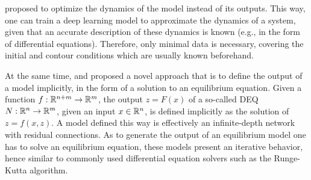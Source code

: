 \textcite{Raissi2019} proposed to optimize the dynamics of the model instead of its outputs.
This way, one can train a deep learning model to approximate the dynamics of a system, given that an accurate description of these dynamics is known (e.g., in the form of differential equations).
Therefore, only minimal data is necessary, covering the initial and contour conditions which are usually known beforehand.

At the same time, \textcite{Bai2019} and \textcite{Ghaoui2019} proposed a novel approach that is to define the output of a model implicitly, in the form of a solution to an equilibrium equation.
Given a function $f:\mathbb{R}^{n+m}\to\mathbb{R}^m$, the output $z = F(x)$ of a so-called \gls{DEQ} $N:\mathbb{R}^n\to \mathbb{R}^m$, given an input $x\in\mathbb{R}^n$, is defined implicitly as the solution of $z = f(x,z)$.
A model defined this way is effectively an infinite-depth network\cite{Bai2019} with residual connections\cite{he_deep_2016}.
As to generate the output of an equilibrium model one has to solve an equilibrium equation, these models present an iterative behavior, hence similar to commonly used differential equation solvers such as the Runge-Kutta algorithm.





